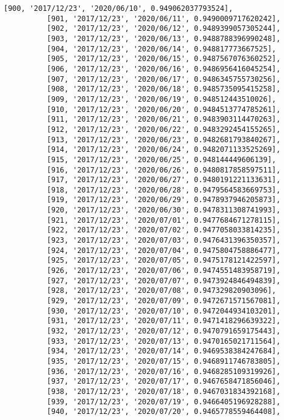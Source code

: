 \documentclass[11pt]{article}
\begin{document}
\begin{Verbatim}[commandchars=\\\{\}]
          [900, '2017/12/23', '2020/06/10', 0.949062037793524],
          [901, '2017/12/23', '2020/06/11', 0.9490009717620242],
          [902, '2017/12/23', '2020/06/12', 0.9489399057305244],
          [903, '2017/12/23', '2020/06/13', 0.9488788396990248],
          [904, '2017/12/23', '2020/06/14', 0.948817773667525],
          [905, '2017/12/23', '2020/06/15', 0.9487567076360252],
          [906, '2017/12/23', '2020/06/16', 0.9486956416045254],
          [907, '2017/12/23', '2020/06/17', 0.9486345755730256],
          [908, '2017/12/23', '2020/06/18', 0.9485735095415258],
          [909, '2017/12/23', '2020/06/19', 0.948512443510026],
          [910, '2017/12/23', '2020/06/20', 0.9484513774785261],
          [911, '2017/12/23', '2020/06/21', 0.9483903114470263],
          [912, '2017/12/23', '2020/06/22', 0.9483292454155265],
          [913, '2017/12/23', '2020/06/23', 0.9482681793840267],
          [914, '2017/12/23', '2020/06/24', 0.9482071133525269],
          [915, '2017/12/23', '2020/06/25', 0.948144449606139],
          [916, '2017/12/23', '2020/06/26', 0.9480817858597511],
          [917, '2017/12/23', '2020/06/27', 0.9480191221133631],
          [918, '2017/12/23', '2020/06/28', 0.9479564583669753],
          [919, '2017/12/23', '2020/06/29', 0.9478937946205873],
          [920, '2017/12/23', '2020/06/30', 0.9478311308741993],
          [921, '2017/12/23', '2020/07/01', 0.9477684671278115],
          [922, '2017/12/23', '2020/07/02', 0.9477058033814235],
          [923, '2017/12/23', '2020/07/03', 0.9476431396350357],
          [924, '2017/12/23', '2020/07/04', 0.9475804758886477],
          [925, '2017/12/23', '2020/07/05', 0.9475178121422597],
          [926, '2017/12/23', '2020/07/06', 0.9474551483958719],
          [927, '2017/12/23', '2020/07/07', 0.9473924846494839],
          [928, '2017/12/23', '2020/07/08', 0.947329820903096],
          [929, '2017/12/23', '2020/07/09', 0.9472671571567081],
          [930, '2017/12/23', '2020/07/10', 0.9472044934103201],
          [931, '2017/12/23', '2020/07/11', 0.9471418296639322],
          [932, '2017/12/23', '2020/07/12', 0.9470791659175443],
          [933, '2017/12/23', '2020/07/13', 0.9470165021711564],
          [934, '2017/12/23', '2020/07/14', 0.9469538384247684],
          [935, '2017/12/23', '2020/07/15', 0.9468911746783805],
          [936, '2017/12/23', '2020/07/16', 0.9468285109319926],
          [937, '2017/12/23', '2020/07/17', 0.9467658471856046],
          [938, '2017/12/23', '2020/07/18', 0.9467031834392168],
          [939, '2017/12/23', '2020/07/19', 0.9466405196928288],
          [940, '2017/12/23', '2020/07/20', 0.9465778559464408],

\end{Verbatim}
\end{document}
